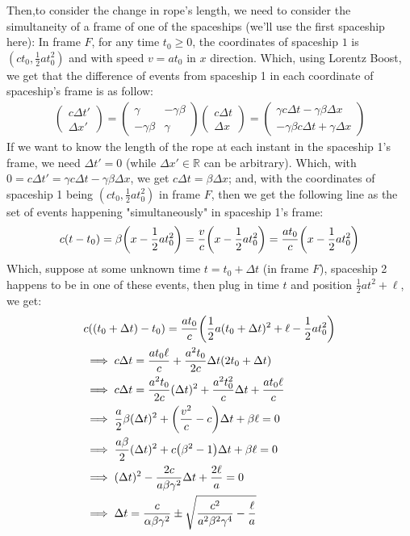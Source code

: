 \documentclass{article}
\newcommand{\RR}{\mathbb{R}}
\DeclarePairedDelimiter{\paran}{(}{)}%
\begin{document}
Then,to consider the change in rope's length, we need to consider the simultaneity of a frame of one of the spaceships (we'll use the first spaceship here): In frame $F$, for any time $t_0\geq 0$, the coordinates of spaceship $1$ is $(ct_0, \frac{1}{2}at_0^2)$ and with speed $v=at_0$ in $x$ direction. Which, using Lorentz Boost, we get that the difference of events from spaceship 1 in each coordinate of spaceship's frame is as follow:
\begin{align}
    \begin{pmatrix}
        c\Delta t'\\\Delta x'
    \end{pmatrix} = \begin{pmatrix}
        \gamma & -\gamma\beta\\ -\gamma\beta&\gamma
    \end{pmatrix}\begin{pmatrix}
        c\Delta t\\\Delta x
    \end{pmatrix} = \begin{pmatrix}
        \gamma c\Delta t-\gamma\beta \Delta x\\ -\gamma\beta c\Delta t + \gamma\Delta x
    \end{pmatrix}
\end{align}
If we want to know the length of the rope at each instant in the spaceship 1's frame, we need $\Delta t'=0$ (while $\Delta x'\in\RR$ can be arbitrary). Which, with $0=c\Delta t' = \gamma c\Delta t-\gamma\beta \Delta x$, we get $c\Delta t = \beta\Delta x$; and, with the coordinates of spaceship 1 being $(ct_0,\frac{1}{2}at_0^2)$ in frame $F$, then we get the following line as the set of events happening "simultaneously" in spaceship 1's frame:
\begin{align}
    c(t - t_0) = \beta\paran*{x-\frac{1}{2}at_0^2} = \frac{v}{c}\paran*{x-\frac{1}{2}at_0^2} = \frac{at_0}{c}\paran*{x-\frac{1}{2}at_0^2}
\end{align}
Which, suppose at some unknown time $t=t_0+\Delta t$ (in frame $F$), spaceship 2 happens to be in one of these events, then plug in time $t$ and position $\frac{1}{2}at^2+\ell$, we get:
\begin{align}
    &c((t_0+\Delta t)-t_0) = \frac{at_0}{c}\paran*{\frac{1}{2}a(t_0+\Delta t)^2+\ell - \frac{1}{2}at_0^2}\\
    &\implies c\Delta t = \frac{at_0\ell}{c} + \frac{a^2t_0}{2c}\Delta t(2t_0+\Delta t)\\
    &\implies c\Delta t = \frac{a^2t_0}{2c}(\Delta t)^2 + \frac{a^2t_0^2}{c}\Delta t+\frac{at_0\ell}{c}\\
    &\implies \frac{a}{2}\beta(\Delta t)^2 + \paran*{\frac{v^2}{c}-c}\Delta t + \beta\ell = 0\\
    &\implies \frac{a\beta}{2}(\Delta t)^2 + c\paran*{\beta^2-1}\Delta t + \beta \ell = 0\\
    &\implies (\Delta t)^2 - \frac{2c}{a\beta\gamma^2}\Delta t + \frac{2\ell}{a}=0\\
    &\implies \Delta t = \frac{c}{\alpha\beta\gamma^2} \pm \sqrt{\frac{c^2}{a^2\beta^2\gamma^4}-\frac{\ell}{a}}
\end{align}
\end{document}
